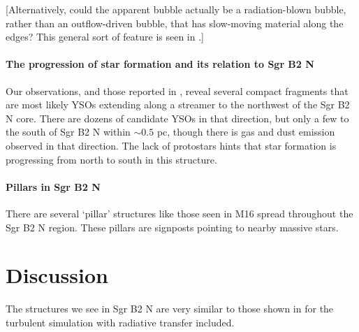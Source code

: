 \documentclass[twocolumn]{aastex61}
\begin{document}
[Alternatively, could the apparent bubble actually be a radiation-blown bubble, rather
than an outflow-driven bubble, that has slow-moving material along the edges?
This general sort of feature is seen in \citet{Rosen2016a}.]


\paragraph{The progression of star formation and its relation to Sgr B2 N}
Our observations, and those reported in \citet{Ginsburg2018a}, reveal several
compact fragments that are most likely YSOs extending along a streamer to the
northwest of the Sgr B2 N core.  There are dozens of candidate YSOs in that
direction, but only a few to the south of Sgr B2 N within $\sim0.5$ pc, though
there is gas and dust emission observed in that direction.  The lack of protostars
hints that star formation is progressing from north to south in this structure.

\paragraph{Pillars in Sgr B2 N}
There are several `pillar' structures like those seen in M16 spread throughout
the Sgr B2 N region.  These pillars are signposts pointing to nearby massive stars.




\section{Discussion}
The structures we see in Sgr B2 N are very similar to those shown in \citet{Rosen2016a}
for the turbulent simulation with radiative transfer included.


\end{document}
